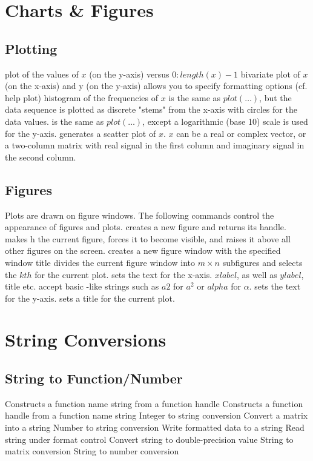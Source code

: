 \section{Charts \& Figures}{}
\subsection{Plotting}{}
	{plot of the values of $x$ (on the y-axis) versus $0:length(x)-1$}
	{bivariate plot of $x$ (on the x-axis) and y (on the y-axis)}
	{allows you to specify formatting options (cf. help plot)}
	{histogram of the frequencies of $x$}
	{is the same as $plot(\ldots)$, but the data sequence is plotted as discrete "stems" from the x-axis with circles for the data values.}
	{is the same as $plot(\ldots)$, except a logarithmic (base 10) scale is used for the y-axis.}
	{generates a scatter plot of $x$. $x$ can be a real or complex vector, or a two-column matrix with real signal in the first column and imaginary signal in the second column.}

\subsection{Figures}{Plots are drawn on figure windows. The following commands
    control the appearance of figures and plots.}
	{creates a new figure and returns its handle.}
	{makes h the current figure, forces it to become visible, and raises it above all other figures on the screen.}
	{creates a new figure window with the specified window title}
	{divides the current figure window into $m \times n$ subfigures and selects the $kth$ for the current plot.}
	{sets the text for the x-axis. $xlabel$, as well as
$ylabel$, title etc. accept basic \ltx-like strings such as $a$\expon $2$ for
$a^2$ or \bs $alpha$ for $\alpha$.}
	{sets the text for the y-axis.}
	{sets a title for the current plot.}

\section{String Conversions}{}
\subsection{String to Function/Number}{}
	{Constructs a function name string from a function handle}
	{Constructs a function handle from a function name string}
	{Integer to string conversion}
	{Convert a matrix into a string}
	{Number to string conversion}
	{Write formatted data to a string}
	{Read string under format control}
	{Convert string to double-precision value}
	{String to matrix conversion}
	{String to number conversion}
